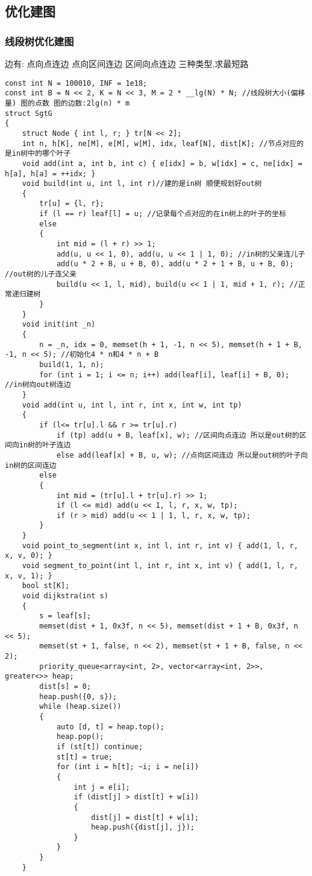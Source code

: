 \documentclass[a4paper, fontset=none]{ctexart}
\begin{document}
\subsection{优化建图}
\subsubsection{线段树优化建图}

边有: \quad 点向点连边 \quad 点向区间连边 \quad 区间向点连边 \quad 三种类型,求最短路


\begin{verbatim}
const int N = 100010, INF = 1e18;
const int B = N << 2, K = N << 3, M = 2 * __lg(N) * N; //线段树大小(偏移量) 图的点数 图的边数:2lg(n) * m
struct SgtG
{
    struct Node { int l, r; } tr[N << 2];
    int n, h[K], ne[M], e[M], w[M], idx, leaf[N], dist[K]; //节点对应的是in树中的哪个叶子
    void add(int a, int b, int c) { e[idx] = b, w[idx] = c, ne[idx] = h[a], h[a] = ++idx; }
    void build(int u, int l, int r)//建的是in树 顺便规划好out树
    {
        tr[u] = {l, r};
        if (l == r) leaf[l] = u; //记录每个点对应的在in树上的叶子的坐标
        else
        {
            int mid = (l + r) >> 1;
            add(u, u << 1, 0), add(u, u << 1 | 1, 0); //in树的父亲连儿子
            add(u * 2 + B, u + B, 0), add(u * 2 + 1 + B, u + B, 0); //out树的儿子连父亲
            build(u << 1, l, mid), build(u << 1 | 1, mid + 1, r); //正常递归建树
        }
    }
    void init(int _n)
    {
        n = _n, idx = 0, memset(h + 1, -1, n << 5), memset(h + 1 + B, -1, n << 5); //初始化4 * n和4 * n + B
        build(1, 1, n);
        for (int i = 1; i <= n; i++) add(leaf[i], leaf[i] + B, 0); //in树向out树连边
    }
    void add(int u, int l, int r, int x, int w, int tp)
    {
        if (l<= tr[u].l && r >= tr[u].r)
            if (tp) add(u + B, leaf[x], w); //区间向点连边 所以是out树的区间向in树的叶子连边
            else add(leaf[x] + B, u, w); //点向区间连边 所以是out树的叶子向in树的区间连边
        else
        {
            int mid = (tr[u].l + tr[u].r) >> 1;
            if (l <= mid) add(u << 1, l, r, x, w, tp);
            if (r > mid) add(u << 1 | 1, l, r, x, w, tp);
        }
    }
    void point_to_segment(int x, int l, int r, int v) { add(1, l, r, x, v, 0); }
    void segment_to_point(int l, int r, int x, int v) { add(1, l, r, x, v, 1); }
    bool st[K];
    void dijkstra(int s)
    {
        s = leaf[s];
        memset(dist + 1, 0x3f, n << 5), memset(dist + 1 + B, 0x3f, n << 5);
        memset(st + 1, false, n << 2), memset(st + 1 + B, false, n << 2);
        priority_queue<array<int, 2>, vector<array<int, 2>>, greater<>> heap;
        dist[s] = 0;
        heap.push({0, s});
        while (heap.size())
        {
            auto [d, t] = heap.top();
            heap.pop();
            if (st[t]) continue;
            st[t] = true;
            for (int i = h[t]; ~i; i = ne[i])
            {
                int j = e[i];
                if (dist[j] > dist[t] + w[i])
                {
                    dist[j] = dist[t] + w[i];
                    heap.push({dist[j], j});
                }
            }
        }
    }


\end{verbatim}
\end{document}
